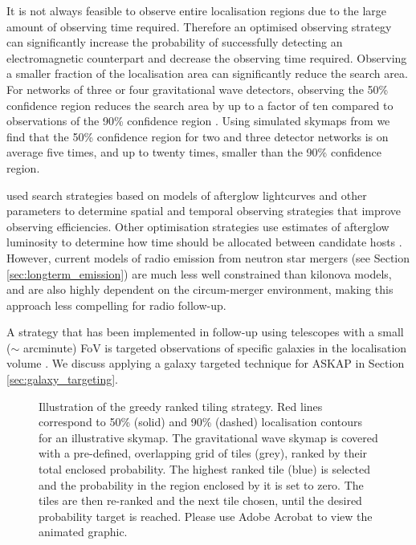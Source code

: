 It is not always feasible to observe entire localisation regions due to the large amount of observing time required. Therefore an optimised observing strategy can significantly increase the probability of successfully detecting an electromagnetic counterpart and decrease the observing time required. Observing a smaller fraction of the localisation area can significantly reduce the search area. For networks of three or four gravitational wave detectors, observing the 50\% confidence region reduces the search area by up to a factor of ten compared to observations of the 90\% confidence region \citep{2011PhRvD..83j2001K,2014MNRAS.443..738B}. Using simulated skymaps from \citet{2014ApJ...795..105S} we find that the 50\% confidence region for two and three detector networks is on average five times, and up to twenty times, smaller than the 90\% confidence region. 

 \cite{2017ApJ...846...62S} used search strategies based on models of afterglow lightcurves and other parameters to determine spatial and temporal observing strategies that improve observing efficiencies. Other optimisation strategies use estimates of afterglow luminosity to determine how time should be allocated between candidate hosts \citep[e.g.][]{2016ExA....42..165C,2017ApJ...848L..33A}. However, current models of radio emission from neutron star mergers (see Section \ref{sec:longterm_emission}) are much less well constrained than kilonova models, and are also highly dependent on the circum-merger environment, making this approach less compelling for radio follow-up.

A strategy that has been implemented in follow-up using telescopes with a small ($\sim$ arcminute) FoV is targeted observations of specific galaxies in the localisation volume \citep[e.g.][]{2016MNRAS.462.1591E,2017ApJ...848L..33A}. We discuss applying a galaxy targeted technique for ASKAP in Section \ref{sec:galaxy_targeting}.



\begin{figure}
    \caption[Illustration of the greedy ranked tiling strategy]{Illustration of the greedy ranked tiling strategy. Red lines correspond to 50\% (solid) and 90\% (dashed) localisation contours for an illustrative skymap. The gravitational wave skymap is covered with a pre-defined, overlapping grid of tiles (grey), ranked by their total enclosed probability. The highest ranked tile (blue) is selected and the probability in the region enclosed by it is set to zero. The tiles are then re-ranked and the next tile chosen, until the desired probability target is reached. Please use Adobe Acrobat to view the animated graphic.}
    \label{fig:greedy_animation}
\end{figure}



